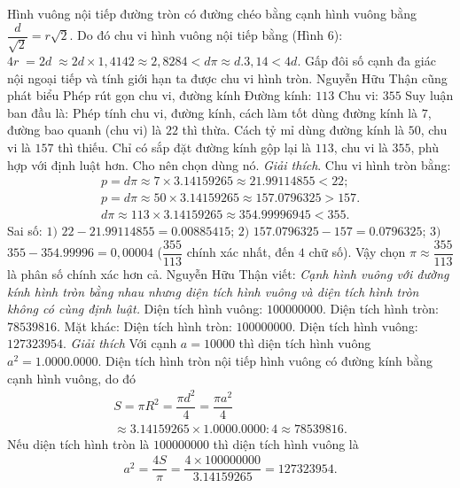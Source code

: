 \begin{multicols}{2}
	Hình vuông nội tiếp đường tròn có đường chéo bằng cạnh hình vuông bằng $\dfrac{d}{{\sqrt 2 }} = r\sqrt 2 .$ Do đó  chu vi hình vuông nội tiếp bằng (Hình $6$): $4r\; = 2d\; \approx 2d \times 1,4142 \approx 2,8284 < d\pi  \approx d.3,14 < 4d$.
	Gấp đôi số cạnh đa giác nội ngoại tiếp và tính giới hạn ta được chu vi hình tròn.
	Nguyễn Hữu Thận cũng phát biểu
	\vskip 0.1cm
	Phép rút gọn chu vi, đường kính
	\vskip 0.1cm 
	Đường kính: $113$	Chu vi: $355$
	\vskip 0.1cm
	Suy luận ban đầu là: Phép tính chu vi, đường kính, cách làm tốt dùng đường kính là $7$, đường bao quanh (chu vi) là $22$ thì thừa. Cách tỷ mỉ dùng đường kính là $50$, chu vi là $157$ thì thiếu. Chỉ có sắp đặt đường kính gộp lại là $113$, chu vi là $355$, phù hợp với định luật hơn. Cho nên chọn dùng nó.
	\vskip 0.1cm 
	\textit{Giải thích}. Chu vi hình tròn bằng:
	\begin{align*}
		p = d\pi  \approx 7 \times 3.14159265 \approx 21.99114855 < 22;\\
		p = d\pi  \approx 50 \times 3.14159265 \approx 157.0796325 > 157.\\
		d\pi  \approx 113 \times 3.14159265 \approx 354.99996945 < 355.
	\end{align*}
	Sai số:
	\vskip 0.1cm 		
	$1)$ $22 - 21.99114855 = 0.00885415$;  
	\vskip 0.1cm
	$2)$ $157.0796325 - 157 = 0.0796325$;
	\vskip 0.1cm
	$3)$ $355 - 354.99996 = 0,00004$
	($\dfrac{{355}}{{113}}$ chính xác nhất, đến $4$ chữ số).
	\vskip 0.1cm
	Vậy chọn $\pi  \approx \dfrac{{355}}{{113}}$ là phân số chính xác hơn cả. 
	\vskip 0.1cm
	Nguyễn Hữu Thận viết: \textit{Cạnh hình vuông với đường kính hình tròn bằng nhau nhưng diện tích hình vuông và diện tích hình tròn không có cùng định luật.}
	\vskip 0.1cm
	Diện tích hình vuông: $100000000$.
	\vskip 0.1cm	
	Diện tích hình tròn: $78539816$.
	\vskip 0.1cm
	Mặt khác:
	\vskip 0.1cm
	Diện tích hình tròn: $100000000$.
	\vskip 0.1cm 	
	Diện tích hình vuông: $127323954$.
	\vskip 0.1cm
	\textit{Giải thích} Với cạnh $a = 10000$ thì diện tích hình vuông ${a^2} = 1.0000.0000$. Diện tích hình tròn nội tiếp hình vuông có đường kính bằng cạnh hình vuông, do đó 
	\begin{align*}
			S = \pi {R^2} = \dfrac{{\pi {d^2}}}{4} = \dfrac{{\pi {a^2}}}{4}\\
			\approx 3.14159265 \times 1.0000.0000:4 \approx 78539816.	
	\end{align*}
	Nếu diện tích hình tròn là $100000000$ thì diện tích hình vuông là
	\begin{align*}
		{a^2} = \dfrac{{4S}}{\pi } = \dfrac{{4 \times 100000000}}{{3.14159265}} = 127323954.

\end{align*}
\end{multicols}
